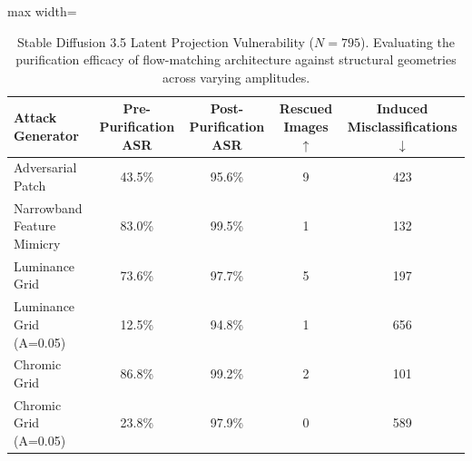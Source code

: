 \begin{table}[htbp]
\centering
\small
\caption{Stable Diffusion 3.5 Latent Projection Vulnerability ($N=795$). Evaluating the purification efficacy of flow-matching architecture against structural geometries across varying amplitudes.}
\label{tab:sd35_purification_matrix}
\begin{adjustbox}{max width=\linewidth}
\begin{tabular}{@{}lcccc@{}}
\toprule
\textbf{Attack Generator} & \textbf{Pre-Purification ASR} & \textbf{Post-Purification ASR} & \textbf{Rescued Images $\uparrow$} & \textbf{Induced Misclassifications $\downarrow$} \\ \midrule
Adversarial Patch & 43.5\% & 95.6\% & 9 & 423 \\
Narrowband Feature Mimicry & 83.0\% & 99.5\% & 1 & 132 \\
Luminance Grid & 73.6\% & 97.7\% & 5 & 197 \\
Luminance Grid (A=0.05) & 12.5\% & 94.8\% & 1 & 656 \\
Chromic Grid & 86.8\% & 99.2\% & 2 & 101 \\
Chromic Grid (A=0.05) & 23.8\% & 97.9\% & 0 & 589 \\
\bottomrule
\end{tabular}
\end{adjustbox}
\end{table}

